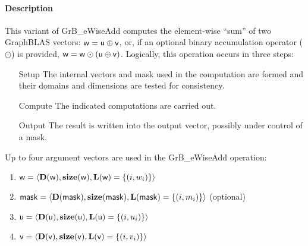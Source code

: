 \paragraph{Description}

This variant of {\sf GrB\_eWiseAdd} computes the element-wise ``sum'' of
two GraphBLAS vectors: ${\sf w} = {\sf u} \oplus {\sf v}$, or, if an optional
binary accumulation operator ($\odot$) is provided, ${\sf w} = {\sf w} \odot
\left({\sf u} \oplus {\sf v}\right)$.  Logically, this operation occurs in
three steps:
\begin{enumerate}[leftmargin=0.75in]
\item[Setup] The internal vectors and mask used in the computation are formed 
and their domains and dimensions are tested for consistency.
\item[Compute] The indicated computations are carried out.
\item[Output] The result is written into the output vector, possibly under 
control of a mask.
\end{enumerate}

Up to four argument vectors are used in the {\sf GrB\_eWiseAdd} operation:
\begin{enumerate}
	\item ${\sf w} = \langle \bold{D}({\sf w}),\bold{size}({\sf w}),\bold{L}({\sf w}) = \{(i,w_i) \} \rangle$
	\item ${\sf mask} = \langle \bold{D}({\sf mask}),\bold{size}({\sf mask}),\bold{L}({\sf mask}) = \{(i,m_i) \} \rangle$ (optional)
	\item ${\sf u} = \langle \bold{D}({\sf u}),\bold{size}({\sf u}),\bold{L}({\sf u}) = \{(i,u_i) \} \rangle$
	\item ${\sf v} = \langle \bold{D}({\sf v}),\bold{size}({\sf v}),\bold{L}({\sf v}) = \{(i,v_i) \} \rangle$
\end{enumerate}

